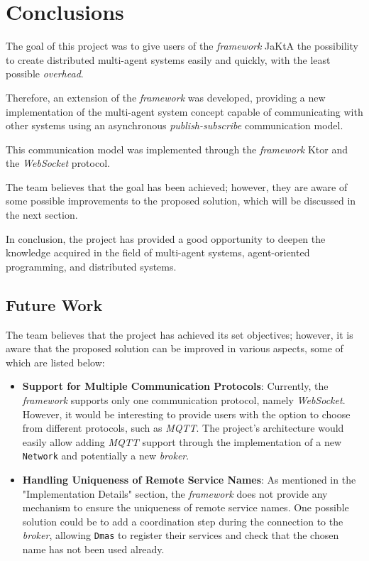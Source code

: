 \section{Conclusions}
The goal of this project was to give users of the \textit{framework} JaKtA the possibility to create distributed multi-agent systems easily and quickly, with the least possible \textit{overhead}.

Therefore, an extension of the \textit{framework} was developed, providing a new implementation of the multi-agent system concept capable of communicating with other systems using an asynchronous \textit{publish-subscribe} communication model.

This communication model was implemented through the \textit{framework} Ktor and the \textit{WebSocket} protocol.

The team believes that the goal has been achieved; however, they are aware of some possible improvements to the proposed solution, which will be discussed in the next section.

In conclusion, the project has provided a good opportunity to deepen the knowledge acquired in the field of multi-agent systems, agent-oriented programming, and distributed systems.


\subsection{Future Work}
The team believes that the project has achieved its set objectives; however, it is aware that the proposed solution can be improved in various aspects, some of which are listed below:
\begin{itemize}
    \item \textbf{Support for Multiple Communication Protocols}: Currently, the \textit{framework} supports only one communication protocol, namely \textit{WebSocket}. However, it would be interesting
    to provide users with the option to choose from different protocols, such as \textit{MQTT}.
    The project's architecture would easily allow adding \textit{MQTT} support through the implementation of a new \texttt{Network} and potentially a new \textit{broker}.
    \item \textbf{Handling Uniqueness of Remote Service Names}: As mentioned in the "Implementation Details" section, the \textit{framework} does not provide any mechanism to ensure
    the uniqueness of remote service names.
    One possible solution could be to add a coordination step during the connection to the \textit{broker}, allowing \texttt{Dmas} to register their services and check that the chosen name has not been used already.
\end{itemize}
